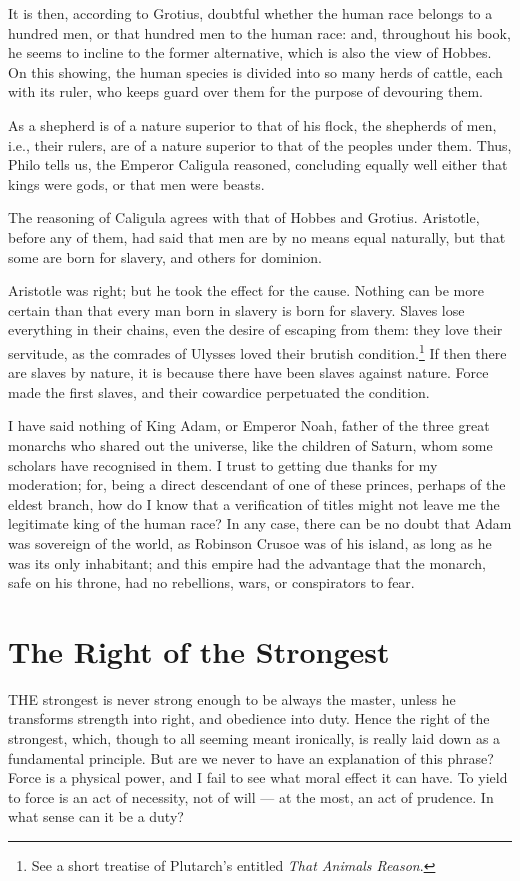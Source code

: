 \documentclass[12pt]{book}
\begin{document}
It is then, according to Grotius, doubtful whether the human race belongs to a hundred men, or that hundred men to the human race: and, throughout his book, he seems to incline to the former alternative, which is also the view of Hobbes. On this showing, the human species is divided into so many herds of cattle, each with its ruler, who keeps guard over them for the purpose of devouring them.

As a shepherd is of a nature superior to that of his flock, the shepherds of men, i.e., their rulers, are of a nature superior to that of the peoples under them. Thus, Philo tells us, the Emperor Caligula reasoned, concluding equally well either that kings were gods, or that men were beasts.

The reasoning of Caligula agrees with that of Hobbes and Grotius. Aristotle, before any of them, had said that men are by no means equal naturally, but that some are born for slavery, and others for dominion.

Aristotle was right; but he took the effect for the cause. Nothing can be more certain than that every man born in slavery is born for slavery. Slaves lose everything in their chains, even the desire of escaping from them: they love their servitude, as the comrades of Ulysses loved their brutish condition.\footnote{See a short treatise of Plutarch's entitled \textit{That Animals Reason}.} If then there are slaves by nature, it is because there have been slaves against nature. Force made the first slaves, and their cowardice perpetuated the condition.

I have said nothing of King Adam, or Emperor Noah, father of the three great monarchs who shared out the universe, like the children of Saturn, whom some scholars have recognised in them. I trust to getting due thanks for my moderation; for, being a direct descendant of one of these princes, perhaps of the eldest branch, how do I know that a verification of titles might not leave me the legitimate king of the human race? In any case, there can be no doubt that Adam was sovereign of the world, as Robinson Crusoe was of his island, as long as he was its only inhabitant; and this empire had the advantage that the monarch, safe on his throne, had no rebellions, wars, or conspirators to fear.
\clearpage
\section{The Right of the Strongest}
THE strongest is never strong enough to be always the master, unless he transforms strength into right, and obedience into duty. Hence the right of the strongest, which, though to all seeming meant ironically, is really laid down as a fundamental principle. But are we never to have an explanation of this phrase? Force is a physical power, and I fail to see what moral effect it can have. To yield to force is an act of necessity, not of will — at the most, an act of prudence. In what sense can it be a duty?
\end{document}
